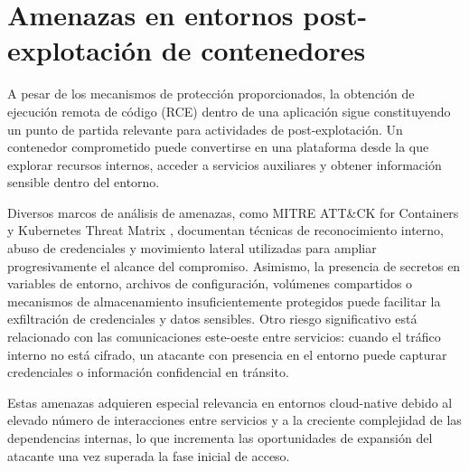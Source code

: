 \documentclass[11pt,spanish,listoffigures,listoftables]{tfgetsinf}
\begin{document}
    \section{Amenazas en entornos post-explotación de contenedores}
    \label{sec:2.3}
    A pesar de los mecanismos de protección proporcionados, la obtención de ejecución remota de código (RCE) dentro de una aplicación sigue constituyendo un punto de partida relevante para actividades de post-explotación. Un contenedor comprometido puede convertirse en una plataforma desde la que explorar recursos internos, acceder a servicios auxiliares y obtener información sensible dentro del entorno.
    
    Diversos marcos de análisis de amenazas, como MITRE ATT\&CK for Containers y Kubernetes Threat Matrix \cite{mitrecontainers}, documentan técnicas de reconocimiento interno, abuso de credenciales y movimiento lateral utilizadas para ampliar progresivamente el alcance del compromiso. Asimismo, la presencia de secretos en variables de entorno, archivos de configuración, volúmenes compartidos o mecanismos de almacenamiento insuficientemente protegidos puede facilitar la exfiltración de credenciales y datos sensibles. Otro riesgo significativo está relacionado con las comunicaciones este-oeste entre servicios: cuando el tráfico interno no está cifrado, un atacante con presencia en el entorno puede capturar credenciales o información confidencial en tránsito.
    
    Estas amenazas adquieren especial relevancia en entornos cloud-native debido al elevado número de interacciones entre servicios y a la creciente complejidad de las dependencias internas, lo que incrementa las oportunidades de expansión del atacante una vez superada la fase inicial de acceso.
\end{document}
